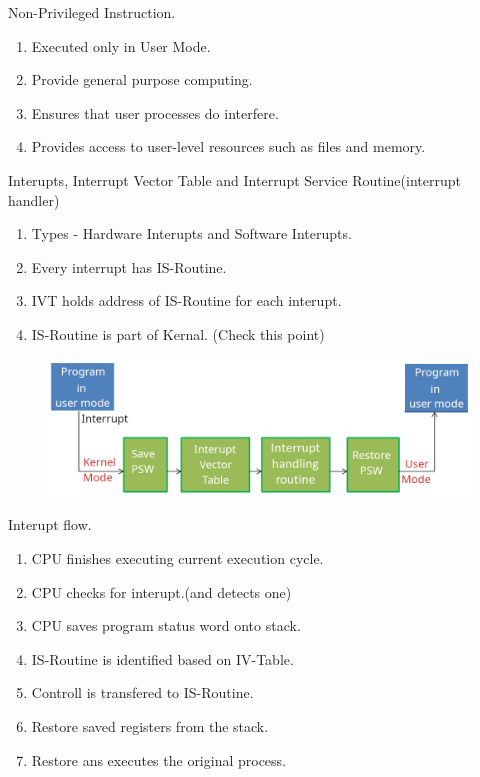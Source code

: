 \begin{enumerate}
  \item Non-Privileged Instruction.
  \begin{enumerate}
        \item Executed only in User Mode.
        \item Provide general purpose computing.
        \item Ensures that user processes do interfere.
        \item Provides access to user-level resources such as files and memory.
  \end{enumerate}


  \item Interupts, Interrupt Vector Table and Interrupt Service Routine(interrupt handler)
  \begin{enumerate}
        \item Types - Hardware Interupts and Software Interupts.
        \item Every interrupt has IS-Routine.
        \item IVT holds address of IS-Routine for each interupt.
        \item IS-Routine is part of Kernal. (Check this point)
  \end{enumerate}

  \begin{figure}[h]
      \centering   \includegraphics[scale=1.6]{./images/Interupt_01.jpeg}
  \end{figure}

  \begin{minipage}{\linewidth}
  \item Interupt flow.
  \begin{enumerate}
        \item CPU finishes executing current execution cycle.
        \item CPU checks for interupt.(and detects one)
        \item CPU saves program status word onto stack.
        \item IS-Routine is identified based on IV-Table.
        \item Controll is transfered to IS-Routine.
        \item Restore saved registers from the stack.
        \item Restore ans executes the original process.
  \end{enumerate}
  \end{minipage}



\end{enumerate}

